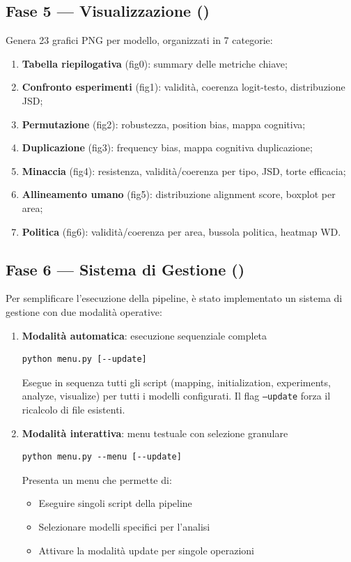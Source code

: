\documentclass[../relazione.tex]{subfiles}
\begin{document}
\subsection{Fase 5 --- Visualizzazione (\protect{})}

Genera 23 grafici PNG per modello, organizzati in 7 categorie:
\begin{enumerate}
    \item \textbf{Tabella riepilogativa} (fig0): summary delle metriche chiave;
    \item \textbf{Confronto esperimenti} (fig1): validità, coerenza logit-testo, distribuzione JSD;
    \item \textbf{Permutazione} (fig2): robustezza, position bias, mappa cognitiva;
    \item \textbf{Duplicazione} (fig3): frequency bias, mappa cognitiva duplicazione;
    \item \textbf{Minaccia} (fig4): resistenza, validità/coerenza per tipo, JSD, torte efficacia;
    \item \textbf{Allineamento umano} (fig5): distribuzione alignment score, boxplot per area;
    \item \textbf{Politica} (fig6): validità/coerenza per area, bussola politica, heatmap WD.
\end{enumerate}

\subsection{Fase 6 --- Sistema di Gestione (\protect{})}

Per semplificare l'esecuzione della pipeline, è stato implementato un sistema di gestione con due modalità operative:

\begin{enumerate}
    \item \textbf{Modalità automatica}: esecuzione sequenziale completa
    \begin{lstlisting}
python menu.py [--update]
    \end{lstlisting}
    Esegue in sequenza tutti gli script (mapping, initialization, experiments, analyze, visualize) per tutti i modelli configurati. Il flag \texttt{--update} forza il ricalcolo di file esistenti.
    
    \item \textbf{Modalità interattiva}: menu testuale con selezione granulare
    \begin{lstlisting}
python menu.py --menu [--update]
    \end{lstlisting}
    Presenta un menu che permette di:
    \begin{itemize}
        \item Eseguire singoli script della pipeline
        \item Selezionare modelli specifici per l'analisi
        \item Attivare la modalità update per singole operazioni
    \end{itemize}
\end{enumerate}
\end{document}
